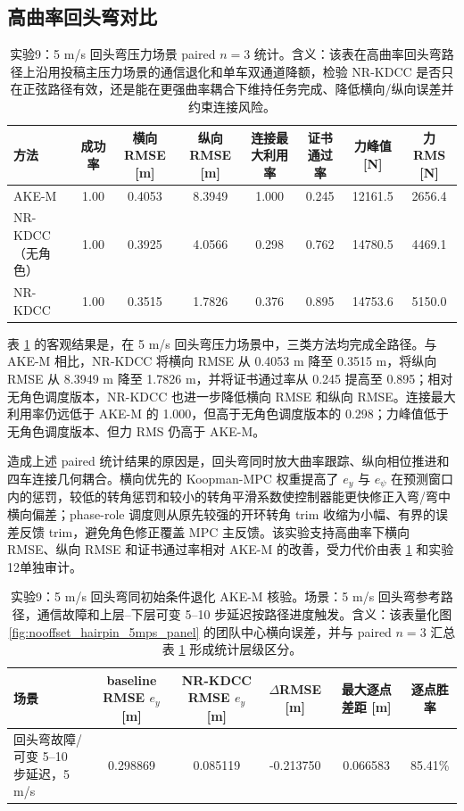 \documentclass[twocolumn,3p,times,procedia]{elsarticle}
\newif\ifNRReview
\newcommand{\reviewblock}[1]{\ifNRReview\par\smallskip\noindent\begingroup\setlength{\fboxsep}{4pt}\colorbox{yellow!35}{\parbox{0.96\linewidth}{\footnotesize\textbf{当前不足：} #1}}\endgroup\par\smallskip\fi}
\newcommand{\AKE}{AKE-M}
\newcommand{\Method}{NR-KDCC}
\begin{document}
\subsection{高曲率回头弯对比}

\begin{table}[!t]
\centering
\caption{实验9：5 m/s 回头弯压力场景 paired $n=3$ 统计。含义：该表在高曲率回头弯路径上沿用投稿主压力场景的通信退化和单车双通道降额，检验 \Method{} 是否只在正弦路径有效，还是能在更强曲率耦合下维持任务完成、降低横向/纵向误差并约束连接风险。}
\label{tab:hairpin_5mps}
\footnotesize
\begin{tabular}{lccccccc}
\toprule
方法 & 成功率 & 横向 RMSE [m] & 纵向 RMSE [m] & 连接最大利用率 & 证书通过率 & 力峰值 [N] & 力 RMS [N] \\
\midrule
\AKE{} & 1.00 & 0.4053 & 8.3949 & 1.000 & 0.245 & 12161.5 & 2656.4\\
\Method{}（无角色） & 1.00 & 0.3925 & 4.0566 & 0.298 & 0.762 & 14780.5 & 4469.1\\
\Method{} & 1.00 & 0.3515 & 1.7826 & 0.376 & 0.895 & 14753.6 & 5150.0\\
\bottomrule
\end{tabular}
\end{table}

表 \ref{tab:hairpin_5mps} 的客观结果是，在 5 m/s 回头弯压力场景中，三类方法均完成全路径。与 \AKE{} 相比，\Method{} 将横向 RMSE 从 0.4053 m 降至 0.3515 m，将纵向 RMSE 从 8.3949 m 降至 1.7826 m，并将证书通过率从 0.245 提高至 0.895；相对无角色调度版本，\Method{} 也进一步降低横向 RMSE 和纵向 RMSE。连接最大利用率仍远低于 \AKE{} 的 1.000，但高于无角色调度版本的 0.298；力峰值低于无角色调度版本、但力 RMS 仍高于 \AKE{}。

造成上述 paired 统计结果的原因是，回头弯同时放大曲率跟踪、纵向相位推进和四车连接几何耦合。横向优先的 Koopman-MPC 权重提高了 $e_y$ 与 $e_\psi$ 在预测窗口内的惩罚，较低的转角惩罚和较小的转角平滑系数使控制器能更快修正入弯/弯中横向偏差；phase-role 调度则从原先较强的开环转角 trim 收缩为小幅、有界的误差反馈 trim，避免角色修正覆盖 MPC 主反馈。该实验支持高曲率下横向 RMSE、纵向 RMSE 和证书通过率相对 \AKE{} 的改善，受力代价由表 \ref{tab:hairpin_5mps} 和实验12单独审计。
\reviewblock{5 m/s 回头弯 paired $n=3$ 中 \Method{} 的力 RMS 仍高于 \AKE{}，因此不能写成“受力代价全面改善”。}

\begin{table}[!tbp]
\centering
\caption{实验9：5 m/s 回头弯同初始条件退化 AKE-M 核验。场景：5 m/s 回头弯参考路径，通信故障和上层--下层可变 5--10 步延迟按路径进度触发。含义：该表量化图 \ref{fig:nooffset_hairpin_5mps_panel} 的团队中心横向误差，并与 paired $n=3$ 汇总表 \ref{tab:hairpin_5mps} 形成统计层级区分。}
\label{tab:nooffset_degraded_hairpin}
\footnotesize
\begin{tabular}{p{}ccccc}
\toprule
场景 & baseline RMSE $e_y$ [m] & \Method{} RMSE $e_y$ [m] & $\Delta$RMSE [m] & 最大逐点差距 [m] & 逐点胜率\\
\midrule
回头弯故障/可变 5--10 步延迟，5 m/s & 0.298869 & 0.085119 & -0.213750 & 0.066583 & 85.41\%\\
\bottomrule
\end{tabular}
\end{table}
\end{document}
